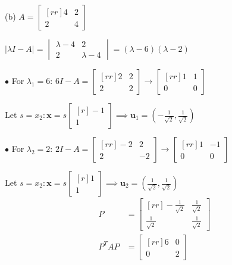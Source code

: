 \documentclass{article}
\newcommand\ddfrac[2]{\frac{\displaystyle #1}{\displaystyle #2}}
\begin{document}
    \begin{minipage}{0.45\linewidth}
        (b) $A = \begin{bmatrix}[rr]
            4 & 2 \\
            2 & 4 
        \end{bmatrix} $

        $| \lambda I - A | = \begin{vmatrix}
            \lambda  - 4 & 2 \\
            2 & \lambda  - 4 
        \end{vmatrix} =  ( \lambda  - 6 )( \lambda  - 2 )$

        $\bullet$ For $ \lambda _1 = 6$: $6I - A = \begin{bmatrix}[rr]
            2 & 2 \\
            2 & 2 
        \end{bmatrix} \to \begin{bmatrix}[rr]
            1 & 1 \\
            0 & 0 
        \end{bmatrix} $

        Let $s = x_2: \textbf{x} = s \begin{bmatrix}[r]
            -1 \\
            1 
        \end{bmatrix} \implies \textbf{u}_1 = \left( - \ddfrac{1}{\sqrt{2}} , \ddfrac{1}{\sqrt{2}}  \right) $

        $\bullet$ For $ \lambda _2 = 2$: $2I - A = \begin{bmatrix}[rr]
            -2 & 2 \\
            2 & -2 
        \end{bmatrix} \to \begin{bmatrix}[rr]
            1 & -1 \\
            0 & 0 
        \end{bmatrix} $

        Let $s = x_2: \textbf{x} = s \begin{bmatrix}[r]
            1 \\
            1 
        \end{bmatrix} \implies \textbf{u}_2 = \left( \ddfrac{1}{\sqrt{2}} , \ddfrac{1}{\sqrt{2}}  \right) $
        \begin{equation*}
            \begin{split}
                P &= \begin{bmatrix}[rr]
                    -\ddfrac{1}{\sqrt{2}}  & \ddfrac{1}{\sqrt{2}}  \\
                    \ddfrac{1}{\sqrt{2}}  & \ddfrac{1}{\sqrt{2}}  
                \end{bmatrix} \\
                    P^TAP& = \begin{bmatrix}[rr]
                    6 & 0 \\
                    0 & 2
                \end{bmatrix} 
            \end{split}
        \end{equation*}
    \end{minipage}
\end{document}
